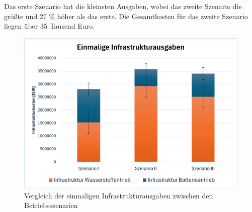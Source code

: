 Das erste Szenario hat die kleinsten Ausgaben, wobei das zweite Szenario die größte und 27 \% höher als das erste.
Die Gesamtkosten für das zweite Szenario liegen über 35 Tausend Euro.
\begin{figure}[h]
	\centering
	\includegraphics[width=0.8\linewidth]{Bilder/Infr_Szenarien.png}
	\caption[Betriebsszenarien]{Vergleich der einmaligen Infrastrukturausgaben zwischen den Betriebsszenarien}
	\label{res_betriebsszenarien}
\end{figure}

